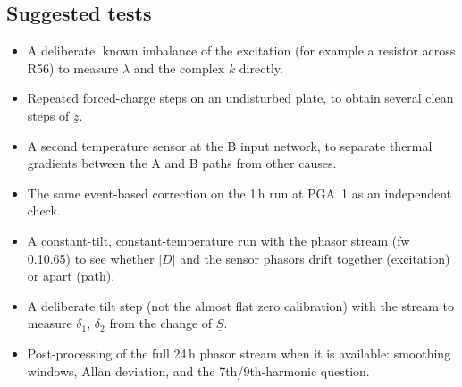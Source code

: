 \documentclass[11pt,a4paper]{article}
\begin{document}
\subsection{Suggested tests}

\begin{itemize}
  \item A deliberate, known imbalance of the excitation (for example a
        resistor across R56) to measure $\lambda$ and the complex $k$
        directly.
  \item Repeated forced-charge steps on an undisturbed plate, to obtain
        several clean steps of $\underline{z}$.
  \item A second temperature sensor at the B input network, to separate
        thermal gradients between the A and B paths from other causes.
  \item The same event-based correction on the 1\,h run at PGA~1 as an
        independent check.
  \item A constant-tilt, constant-temperature run with the phasor stream
        (fw 0.10.65) to see whether $|\underline{D}|$ and the sensor phasors
        drift together (excitation) or apart (path).
  \item A deliberate tilt step (not the almost flat zero calibration) with the stream to measure
        $\delta_1$, $\delta_2$ from the change of $\underline{S}$.
  \item Post-processing of the full 24\,h phasor stream when it is available:
        smoothing windows, Allan deviation, and the 7th/9th-harmonic question.
\end{itemize}
\end{document}
